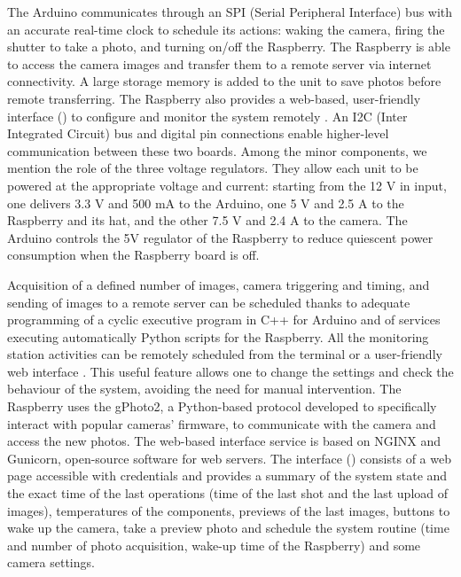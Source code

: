 The Arduino communicates through an SPI (Serial Peripheral Interface) bus with an
accurate real-time clock to schedule its actions: waking the camera, firing the shutter
to take a photo, and turning on/off the Raspberry. The Raspberry is able to access the
camera images and transfer them to a remote server via internet connectivity. A large
storage memory is added to the unit to save photos before remote transferring. The
Raspberry also provides a web-based, user-friendly interface
() to configure and monitor the system remotely
\citep{greig}.
An I2C (Inter Integrated Circuit) bus and digital pin connections enable higher-level
communication between these two boards. Among the minor components, we mention the role
of the three voltage regulators. They allow each unit to be powered at the appropriate
voltage and current: starting from the 12 V in input, one delivers 3.3 V and 500 mA to
the Arduino, one 5 V and 2.5 A to the Raspberry and its hat, and the other 7.5 V and 2.4
A to the camera. The Arduino controls the 5V regulator of the Raspberry to reduce
quiescent power consumption when the Raspberry board is off.

Acquisition of a defined number of images, camera triggering and timing, and sending of
images to a remote server can be scheduled thanks to adequate programming of a cyclic
executive program in C++ for Arduino and  of services executing automatically Python
scripts for the Raspberry.
All the monitoring station activities can be remotely scheduled from the terminal or a
user-friendly web interface \citep{greig}. This useful feature allows one to change the
settings and check the behaviour of the system, avoiding the need for manual
intervention. The Raspberry uses the gPhoto2, a Python-based protocol developed to
specifically interact with popular cameras’ firmware, to communicate with the camera and
access the new photos. The  web-based interface service is based on NGINX and Gunicorn,
open-source software for web servers. The interface ()
consists of a web page accessible with credentials and provides a summary of the system
state and the exact time of the last operations (time of the last shot and the last
upload of images), temperatures of the components, previews of the last images, buttons
to wake up the camera, take a preview photo and schedule the system routine (time and
number of photo acquisition, wake-up time of the Raspberry) and some camera settings.

